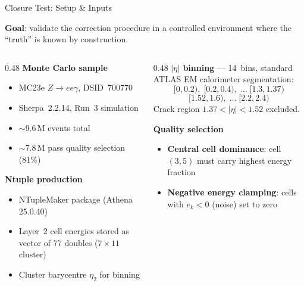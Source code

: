 \documentclass[aspectratio=169,10pt]{beamer}
\begin{document}
\begin{frame}{Closure Test: Setup \& Inputs}

\textbf{Goal}: validate the correction procedure in a controlled environment
where the ``truth'' is known by construction.

\vspace{4pt}
\begin{columns}[T]
\begin{column}{0.48\textwidth}
  \textbf{Monte Carlo sample}
  \begin{itemize}
    \item MC23e $Z\to ee\gamma$, DSID~700770
    \item Sherpa~2.2.14, Run~3 simulation
    \item $\sim$9.6\,M events total
    \item $\sim$7.8\,M pass quality selection (81\%)
  \end{itemize}
  \vspace{4pt}
  \textbf{Ntuple production}
  \begin{itemize}
    \item NTupleMaker package (Athena 25.0.40)
    \item Layer~2 cell energies stored as vector of
          77 doubles ($7\!\times\!11$ cluster)
    \item Cluster barycentre $\eta_2$ for binning
  \end{itemize}
\end{column}
\begin{column}{0.48\textwidth}
  \textbf{$|\eta|$ binning} — 14~bins, standard ATLAS
  EM calorimeter segmentation:
  {\small
  \[
    [0,0.2),\; [0.2,0.4),\; \ldots\; [1.3,1.37)
  \]
  \[
    [1.52,1.6),\; \ldots\; [2.2,2.4)
  \]
  }
  Crack region $1.37 < |\eta| < 1.52$ excluded.
  \vspace{4pt}

  \textbf{Quality selection}
  \begin{itemize}
    \item \textbf{Central cell dominance}: cell~$(3,5)$ must
          carry highest energy fraction
    \item \textbf{Negative energy clamping}: cells with $e_k < 0$
          (noise) set to zero
  \end{itemize}
\end{column}
\end{columns}
\end{frame}
\end{document}
